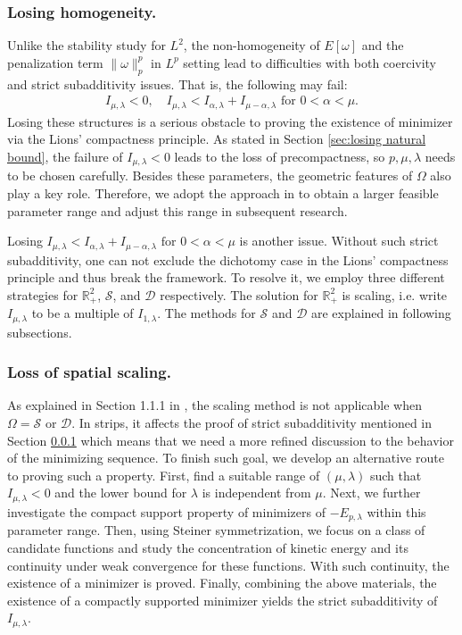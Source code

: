 \documentclass[11pt,letterpaper]{amsart}
\theoremstyle{definition}
\theoremstyle{remark}
\newcommand{\D}{\mathcal{D}}
\renewcommand{\S}{\mathcal{S}}
\newcommand{\R}{\mathbb{R}}
\renewcommand{\O}{\Omega}
\renewcommand{\tt}[1]{\text{#1}}
\numberwithin{equation}{section}
\begin{document}
\subsubsection{Losing homogeneity.} \label{sec:in homogeneous issue}
Unlike the stability study for $L^2$, the non-homogeneity of $E[\omega]$ and the penalization term $\|\omega\|_p^p$ in $L^p$ setting lead to difficulties with both coercivity and strict subadditivity issues. That is, the following may fail:
\begin{align*}
    I_{\mu,\lambda}<0, \quad I_{\mu,\lambda} < I_{\alpha,\lambda}+I_{\mu-\alpha,\lambda} \tt{ for } 0<\alpha<\mu.
\end{align*}
Losing these structures is a serious obstacle to proving the existence of minimizer via the Lions’ compactness principle. As stated in Section \ref{sec:losing natural bound}, the failure of $I_{\mu,\lambda}<0$ leads to the loss of precompactness, so $p,\mu,\lambda$ needs to be chosen carefully. Besides these parameters, the geometric features of $\O$ also play a key role. Therefore, we adopt the approach in \cite{Dong2026StabilityOV} to obtain a larger feasible parameter range and adjust this range in subsequent research. 

Losing $I_{\mu,\lambda} < I_{\alpha,\lambda}+I_{\mu-\alpha,\lambda} \tt{ for } 0<\alpha<\mu$ is another issue. Without such strict subadditivity, one can not exclude the dichotomy case in the Lions’ compactness principle and thus break the framework. To resolve it, we employ three different strategies for $\R^2_+$, $\S$, and $\D$ respectively. The solution for $\R^2_+$ is scaling, i.e. write $I_{\mu,\lambda}$ to be a multiple of $I_{1,\lambda}$. The methods for $\S$ and $\D$ are explained in following subsections.

\subsubsection{Loss of spatial scaling.}  \label{sec:difficulty_loss_scaling}
As explained in Section 1.1.1 in \cite{Dong2026StabilityOV}, the scaling method is not applicable when $\O=\S$ or $\D$. In strips, it affects the proof of strict subadditivity mentioned in Section \ref{sec:in homogeneous issue} which means that we need a more refined discussion to the behavior of the minimizing sequence. To finish such goal, we develop an alternative route to proving such a property. First, find a suitable range of $(\mu,\lambda)$ such that $I_{\mu,\lambda}<0$ and the lower bound for $\lambda$ is independent from $\mu$. Next, we further investigate the compact support property of minimizers of $-E_{p,\lambda}$ within this parameter range. Then, using Steiner symmetrization, we focus on a class of candidate functions and study the concentration of kinetic energy and its continuity under weak convergence for these functions. With such continuity, the existence of a minimizer is proved. Finally, combining the above materials, the existence of a compactly supported minimizer yields the strict subadditivity of $I_{\mu,\lambda}$.
\end{document}
